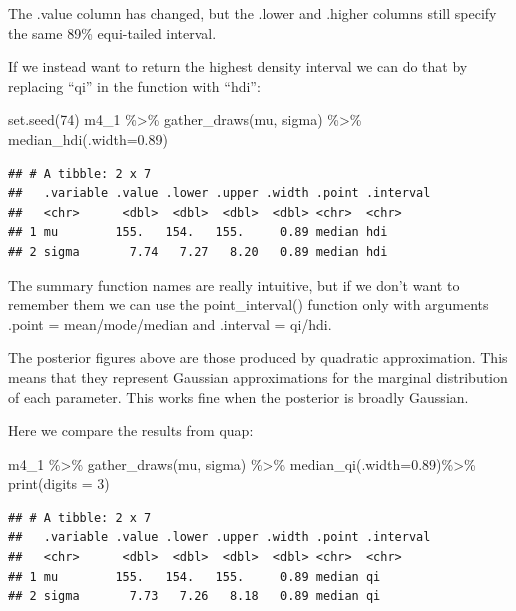 \documentclass[
]{book}
\newenvironment{Shaded}{\begin{snugshade}}{\end{snugshade}}
\newcommand{\AttributeTok}[1]{\textcolor[rgb]{0.77,0.63,0.00}{#1}}
\newcommand{\DecValTok}[1]{\textcolor[rgb]{0.00,0.00,0.81}{#1}}
\newcommand{\FloatTok}[1]{\textcolor[rgb]{0.00,0.00,0.81}{#1}}
\newcommand{\FunctionTok}[1]{\textcolor[rgb]{0.00,0.00,0.00}{#1}}
\newcommand{\NormalTok}[1]{#1}
\newcommand{\SpecialCharTok}[1]{\textcolor[rgb]{0.00,0.00,0.00}{#1}}
\begin{document}
The .value column has changed, but the .lower and .higher columns still specify the same 89\% equi-tailed interval.

If we instead want to return the highest density interval we can do that by replacing ``qi'' in the function with ``hdi'':

\begin{Shaded}
\begin{Highlighting}[]
\FunctionTok{set.seed}\NormalTok{(}\DecValTok{74}\NormalTok{)}
\NormalTok{m4\_1 }\SpecialCharTok{\%\textgreater{}\%}
  \FunctionTok{gather\_draws}\NormalTok{(mu, sigma) }\SpecialCharTok{\%\textgreater{}\%}
  \FunctionTok{median\_hdi}\NormalTok{(}\AttributeTok{.width=}\FloatTok{0.89}\NormalTok{)}
\end{Highlighting}
\end{Shaded}

\begin{verbatim}
## # A tibble: 2 x 7
##   .variable .value .lower .upper .width .point .interval
##   <chr>      <dbl>  <dbl>  <dbl>  <dbl> <chr>  <chr>    
## 1 mu        155.   154.   155.     0.89 median hdi      
## 2 sigma       7.74   7.27   8.20   0.89 median hdi
\end{verbatim}

The summary function names are really intuitive, but if we don't want to remember them we can use the point\_interval() function only with arguments .point = mean/mode/median and .interval = qi/hdi.

The posterior figures above are those produced by quadratic approximation. This means that they represent Gaussian approximations for the marginal distribution of each parameter. This works fine when the posterior is broadly Gaussian.

Here we compare the results from quap:

\begin{Shaded}
\begin{Highlighting}[]
\NormalTok{m4\_1 }\SpecialCharTok{\%\textgreater{}\%}
  \FunctionTok{gather\_draws}\NormalTok{(mu, sigma) }\SpecialCharTok{\%\textgreater{}\%}
  \FunctionTok{median\_qi}\NormalTok{(}\AttributeTok{.width=}\FloatTok{0.89}\NormalTok{)}\SpecialCharTok{\%\textgreater{}\%}
  \FunctionTok{print}\NormalTok{(}\AttributeTok{digits =} \DecValTok{3}\NormalTok{)}
\end{Highlighting}
\end{Shaded}

\begin{verbatim}
## # A tibble: 2 x 7
##   .variable .value .lower .upper .width .point .interval
##   <chr>      <dbl>  <dbl>  <dbl>  <dbl> <chr>  <chr>    
## 1 mu        155.   154.   155.     0.89 median qi       
## 2 sigma       7.73   7.26   8.18   0.89 median qi
\end{verbatim}
\end{document}
